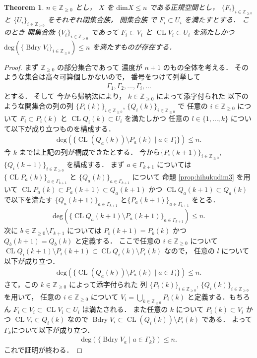 \documentclass[leqno, a4paper, 12pt]{jsarticle}
\theoremstyle{plain}
\newtheorem{thm}{Theorem}[section]
\theoremstyle{definition}
\theoremstyle{remark}
\newcommand{\zz}{\mathbb{Z}}
\DeclareMathOperator{\bd}{\mathrm{Bdry}}
\DeclareMathOperator{\cl}{\mathrm{CL}}
\newcommand{\yodim}{\mathrm{dim}}
\newcommand{\yodeg}{\mathrm{deg}}
\numberwithin{equation}{section}
\begin{document}
\begin{thm}\label{thm:countablefam}
$n\in \zz_{\ge 0}$
とし，
$X$
を
$\yodim X\le n$
である正規空間とし，
$\{F_{i}\}_{i\in \zz_{\ge 0}}$
と
$\{U_{i}\}_{i\in \zz_{\ge 0}}$
をそれぞれ閉集合族，
開集合族
で
$F_{i}\subset U_{i}$
を満たすとする．
このとき
開集合族
$\{V_{i}\}_{i\in \zz_{\ge 0}}$
であって
$F_{i}\subset V_{i}$
と
$\cl V_{i}\subset U_{i}$
を満たしかつ
$\yodeg(\{\bd V_{i}\}_{i\in \zz_{\ge 0}})\le n$
を満たすものが存在する．
\end{thm}
\begin{proof}
まず
$\zz_{\ge 0}$
の部分集合であって
濃度が
$n+1$
のもの全体を考える．
そのような集合は高々可算個しかないので，
番号をつけて列挙して
\begin{align}
\Gamma_{1}, \Gamma_{2}, \dots, \Gamma_{i}, \dots
\end{align}
とする．
そして
今から帰納法により，
$k\in \zz_{\ge 0}$
によって添字付られた
以下のような開集合の列の列
$\{P_{i}(k)\}_{i\in \zz_{\ge 0}}$, 
$\{Q_{i}(k)\}_{i\in \zz_{\ge 0}}$
で
任意の
$i\in \zz_{\ge 0}$
について
$F_{i}\subset P_{i}(k)$
と
$\cl Q_{i}(k)\subset U_{i}$
を満たしかつ
任意の
$l\in \{1, \dots, k\}$
について以下が成り立つものを構成する．
\begin{align}
\yodeg(\{\cl (Q_{a}(k))\setminus P_{a}(k)\mid a\in \Gamma_{l}\})\le n. 
\end{align}
今
$k$
までは上記の列が構成できたとする．
今から$\{P_{i}(k+1)\}_{i\in \zz_{\ge 0}}$, 
$\{Q_{i}(k+1)\}_{i\in \zz_{\ge 0}}$
を構成する．
まず
$a\in \Gamma_{k+1}$
については
$\{\cl P_{a}(k)\}_{a\in \Gamma_{k+1}}$
と
$\{Q_{a}(k)\}_{a\in \Gamma_{k+1}}$
について
命題
\ref{prop:hihukudim3}
を用いて
$\cl P_{a}(k)\subset P_{a}(k+1)\subset Q_{a}(k+1)$
かつ
$\cl Q_{a}(k+1)\subset Q_{a}(k)$
で以下を満たす
$\{Q_{a}(k+1)\}_{a\in \Gamma_{k+1}}$
と$\{P_{a}(k+1)\}_{a\in \Gamma_{k+1}}$
をとる．
\begin{align}
\yodeg(\{\cl Q_{a}(k+1)\setminus P_{a}(k+1)\}_{a\in \Gamma_{k+1}})\le n. 
\end{align}
次に
$b\in \zz_{\ge 0}\setminus \Gamma_{k+1}$
については
$P_{b}(k+1)=P_{b}(k)$
かつ
$Q_{b}(k+1)=Q_{b}(k)$
と定義する．
ここで任意の
$i\in \zz_{\ge 0}$
について
$\cl Q_{i}(k+1)\setminus P_{i}(k+1)\subset \cl Q_{i}(k)\setminus P_{i}(k)$
なので，
任意の
$l$
について以下が成り立つ．
\begin{align}
\yodeg(\{\cl (Q_{a}(k))\setminus P_{a}(k)\mid a\in \Gamma_{l}\})\le n. 
\end{align}
さて，この
$k\in \zz_{\ge 0}$
によって添字付られた
列
$\{P_{i}(k)\}_{i\in \zz_{\ge 0}}$, 
$\{Q_{i}(k)\}_{i\in \zz_{\ge 0}}$
を用いて，
任意の
$i\in \zz_{\ge 0}$
について
$V_{i}=\bigcup_{k\in \zz_{\ge 0}}P_{i}(k)$
と定義する．もちろん
$F_{i}\subset V_{i}\subset \cl V_{i}\subset U_{i}$
は満たされる．
また任意の
$k$
について
$P_{i}(k)\subset V_{i}$
かつ
$\cl V_{i}\subset Q_{i}(k)$
なので
$\bd V_{i}\subset \cl(Q_{i}(k))\setminus P_{i}(k)$
である．
よって
$\Gamma_{k}$について以下が成り立つ．
\begin{align}
\yodeg(\{\bd V_{a}\mid a\in \Gamma_{k}\})\le n. 
\end{align}
これで証明が終わる．
\end{proof}
\end{document}
